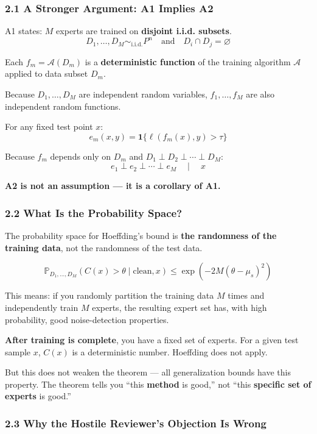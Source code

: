 \documentclass[
  12pt,
]{ctexart}
\begin{document}
\subsubsection{2.1 A Stronger Argument: A1 Implies A2}\label{a1-implies-a2}

A1 states: \(M\) experts are trained on \textbf{disjoint i.i.d. subsets}.
\[D_1, \dots, D_M \sim_{\text{i.i.d.}} P^n \quad \text{and} \quad D_i \cap D_j = \varnothing\]

Each \(f_m = \mathcal{A}(D_m)\) is a \textbf{deterministic function} of the training algorithm \(\mathcal{A}\) applied to data subset \(D_m\).

Because \(D_1, \dots, D_M\) are independent random variables, \(f_1, \dots, f_M\) are also independent random functions.

For any fixed test point \(x\):
\[e_m(x, y) = \mathbf{1}\{\ell(f_m(x), y) > \tau\}\]

Because \(f_m\) depends only on \(D_m\) and
\(D_1 \perp D_2 \perp \cdots \perp D_M\):
\[e_1 \perp e_2 \perp \cdots \perp e_M \quad \mid \quad x\]

\textbf{A2 is not an assumption --- it is a corollary of A1.}

\subsubsection{2.2 What Is the Probability Space?}\label{what-is-the-probability-space}

The probability space for Hoeffding's bound is \textbf{the randomness of the training data}, not the randomness of the test data.

\[\mathbb{P}_{D_1,\dots,D_M}\left(C(x) > \theta \mid \text{clean}, x\right) \leq \exp(-2M(\theta-\mu_s)^2)\]

This means: if you randomly partition the training data \(M\) times and independently train \(M\) experts, the resulting expert set has, with high probability, good noise-detection properties.

\textbf{After training is complete}, you have a fixed set of experts. For a given test sample \(x\), \(C(x)\) is a deterministic number. Hoeffding does not apply.

But this does not weaken the theorem --- all generalization bounds have this property. The theorem tells you ``this \textbf{method} is good,'' not ``this \textbf{specific set of experts} is good.''

\subsubsection{2.3 Why the Hostile Reviewer's Objection Is Wrong}\label{why-the-hostile-reviewers-objection-is-wrong}
\end{document}
